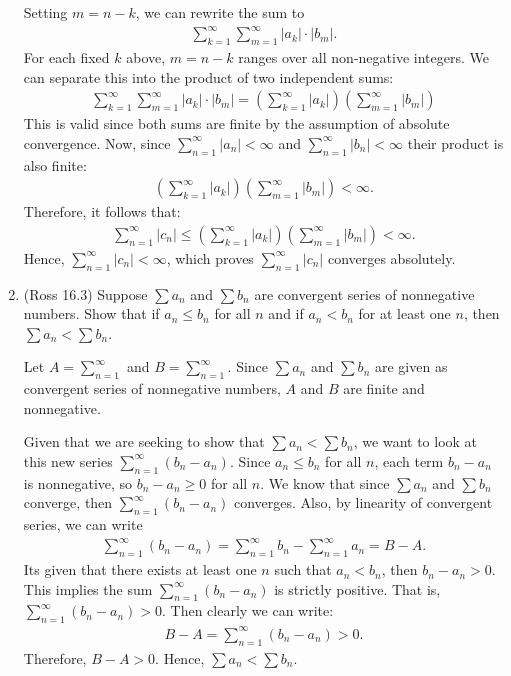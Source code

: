 \documentclass [10pt]{article}
\newcommand{\jg}[1]{{\color{blue} #1}}
\begin{document}
\begin{enumerate}
{Setting $m = n-k$, we can rewrite the sum to 
\begin{align*}
    \sum_{k=1}^\infty \sum_{m=1}^\infty |a_k| \cdot |b_{m}|.
\end{align*}
For each fixed $k$ above, $m=n-k$ ranges over all non-negative integers. We can separate this into the product of two independent sums: 
\begin{align*}
    \sum_{k=1}^\infty \sum_{m=1}^\infty |a_k| \cdot |b_{m}| = \left( \sum_{k=1}^\infty |a_k| \right) \left( \sum_{m=1}^\infty |b_m| \right)
\end{align*}
This is valid since both sums are finite by the assumption of absolute convergence. Now, since $\sum_{n=1}^\infty |a_n| < \infty$ and $\sum_{n=1}^\infty |b_n| < \infty$ their product is also finite: 
\begin{align*}
    \left( \sum_{k=1}^\infty |a_k| \right) \left( \sum_{m=1}^\infty |b_m| \right) < \infty.
\end{align*}
Therefore, it follows that:
\begin{align*}
    \sum_{n=1}^\infty |c_n| \leq \left( \sum_{k=1}^\infty |a_k| \right) \left( \sum_{m=1}^\infty |b_m| \right) < \infty.
\end{align*}
Hence, $\sum_{n=1}^\infty |c_n| < \infty$, which proves $\sum_{n=1}^\infty |c_n|$ converges absolutely. 
}



\clearpage
\item (Ross 16.3) Suppose $\sum a_n$ and $\sum b_n$ are convergent series of nonnegative numbers. Show that if $a_n \leq b_n$ for all $n$ and if $a_n<b_n$ for at least one $n$, then $\sum a_n<\sum b_n$.

\jg{
Let $A = \sum_{n=1}^\infty$ and $B = \sum_{n=1}^\infty$. Since $\sum a_n$ and $\sum b_n$ are given as convergent series of nonnegative numbers, $A$ and $B$ are finite and nonnegative. 

Given that we are seeking to show that $\sum a_n<\sum b_n$, we want to look at this new series $\sum_{n=1}^\infty (b_n - a_n)$. Since $a_n \leq b_n$ for all $n$, each term $b_n - a_n$ is nonnegative, so $b_n - a_n \geq 0$ for all $n$. We know that since $\sum a_n$ and $\sum b_n$ converge, then $\sum_{n=1}^\infty (b_n - a_n)$ converges. Also, by linearity of convergent series, we can write
\begin{align*}
    \sum_{n=1}^\infty (b_n - a_n) = \sum_{n=1}^\infty b_n - \sum_{n=1}^\infty  a_n = B - A. 
\end{align*}
Its given that there exists at least one $n$ such that $a_n < b_n$, then $b_n - a_n > 0$. This implies the sum $\sum_{n=1}^\infty (b_n - a_n)$ is strictly positive. That is, $\sum_{n=1}^\infty (b_n - a_n) > 0$. Then clearly we can write: 
\begin{align*}
    B - A = \sum_{n=1}^\infty (b_n - a_n) > 0. 
\end{align*}
Therefore, $B - A > 0$. Hence, $\sum a_n < \sum b_n$. 
}




\end{enumerate}
\end{document}
